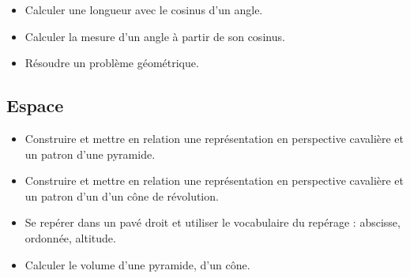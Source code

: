 \documentclass[a4paper,12pt,fleqn]{article}	
\begin{document}
\begin{itemize}
	\item {}Calculer une longueur avec le cosinus d'un angle.
	\item {}Calculer la mesure d'un angle à partir de son cosinus.
	\item {}Résoudre un problème géométrique.
\end{itemize}

\subsection*{Espace}

\begin{itemize}
	\item {}Construire et mettre en relation une représentation en perspective cavalière et un patron d’une pyramide.
	\item {}Construire et mettre en relation une représentation en perspective cavalière et un patron d’un d’un cône de révolution.
	\item {}Se repérer dans un pavé droit et utiliser le vocabulaire du repérage : abscisse, ordonnée, altitude.
	\item {}Calculer le volume d’une pyramide, d’un cône.
\end{itemize}
	
\end{document}
